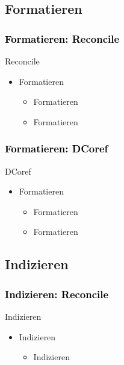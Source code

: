 \documentclass[xcolor=dvipsnames]{beamer}
\begin{document}
\subsection{Formatieren}


\begin{frame}\frametitle{\textcolor{black}{Formatieren: Reconcile}}

\begin{block}{Reconcile}
\begin{itemize}
\item Formatieren
\begin{itemize}
\item Formatieren
\item Formatieren
\end{itemize}
\end{itemize}
\end{block}

\end{frame}


\begin{frame}\frametitle{\textcolor{black}{Formatieren: DCoref}}

\begin{block}{DCoref}
\begin{itemize}
\item Formatieren
\begin{itemize}
\item Formatieren
\item Formatieren
\end{itemize}
\end{itemize}
\end{block}

\end{frame}



\subsection{Indizieren}


\begin{frame}\frametitle{\textcolor{black}{Indizieren: Reconcile}}

\begin{block}{Indizieren}
\begin{itemize}
\item Indizieren
\begin{itemize}
\item Indizieren
\end{itemize}
\end{itemize}
\end{block}

\end{frame}
\end{document}
